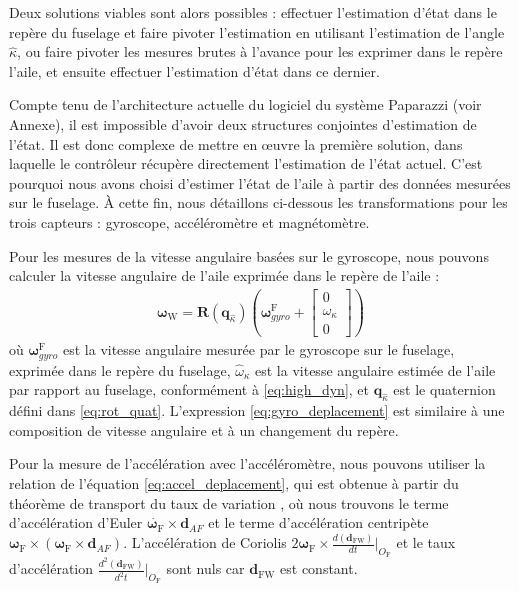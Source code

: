 Deux solutions viables sont alors possibles : effectuer l'estimation d'état dans le repère du fuselage et faire pivoter l'estimation en utilisant l'estimation de l'angle $\hat{\kappa}$, ou faire pivoter les mesures brutes à l'avance pour les exprimer dans le repère l'aile, et ensuite effectuer l'estimation d'état dans ce dernier. 

Compte tenu de l'architecture actuelle du logiciel du système Paparazzi (voir Annexe), il est impossible d'avoir deux structures conjointes d'estimation de l'état. Il est donc complexe de mettre en œuvre la première solution, dans laquelle le contrôleur récupère directement l'estimation de l'état actuel. C'est pourquoi nous avons choisi d'estimer l'état de l'aile à partir des données mesurées sur le fuselage. À cette fin, nous détaillons ci-dessous les transformations pour les trois capteurs : gyroscope, accéléromètre et magnétomètre. 

Pour les mesures de la vitesse angulaire basées sur le gyroscope, nous pouvons calculer la vitesse angulaire de l'aile exprimée dans le repère de l'aile :
\begin{align}
    \label{eq:gyro_deplacement}
    \boldsymbol{\omega}_{\text{W}} = \boldsymbol{R}(\boldsymbol{q}_{\hat{\kappa}}) \left( \boldsymbol{\omega}_{gyro}^{\text{F}} + \begin{bmatrix}
    0\\ \omega_{\kappa} \\ 0
    \end{bmatrix}  \right) 
\end{align}
où $\boldsymbol{\omega}_{gyro}^{\text{F}}$ est la vitesse angulaire mesurée par le gyroscope sur le fuselage, exprimée dans le repère du fuselage, $\hat{\omega}_{\kappa}$ est la vitesse angulaire estimée de l'aile par rapport au fuselage, conformément à \eqref{eq:high_dyn}, et $\boldsymbol{q}_{\hat{\kappa}}$ est le quaternion défini dans \eqref{eq:rot_quat}.
L'expression \eqref{eq:gyro_deplacement} est similaire à une composition de vitesse angulaire et à un changement du repère.

Pour la mesure de l'accélération avec l'accéléromètre, nous pouvons utiliser la relation de l'équation \eqref{eq:accel_deplacement}, qui est obtenue à partir du théorème de transport du taux de variation \cite{brizard2004motion}, où nous trouvons le terme d'accélération d'Euler $\dot{\boldsymbol{\omega}_{\text{F}}} \times \boldsymbol{d}_{AF}$  et le terme d'accélération centripète $\boldsymbol{\omega}_{\text{F}} \times ( \boldsymbol{\omega}_{\text{F}} \times  \boldsymbol{d}_{AF})$. L'accélération de Coriolis $2\boldsymbol{\omega}_{\text{F}} \times \frac{d (\boldsymbol{d}_{\text{FW}})}{d t}\Bigr|_{O_{\text{F}}}$ et le taux d'accélération $\frac{d^{2} (\boldsymbol{d}_{\text{FW}})}{d^{2} t}\Bigr|_{O_{\text{F}}}$ sont nuls car $\boldsymbol{d}_{\text{FW}}$ est constant.

